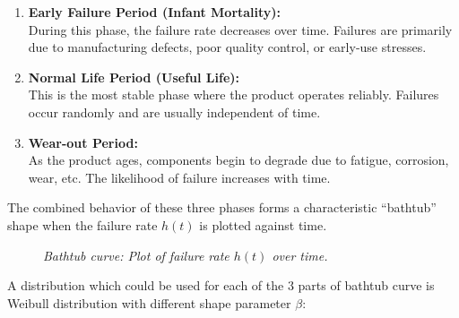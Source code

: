 \documentclass[twoside]{book}
\begin{document}
\begin{enumerate}
    \item \textbf{Early Failure Period (Infant Mortality):} \\
    During this phase, the failure rate decreases over time. Failures are primarily due to manufacturing defects, poor quality control, or early-use stresses. \\

    \item \textbf{Normal Life Period (Useful Life):} \\
    This is the most stable phase where the product operates reliably. Failures occur randomly and are usually independent of time. \\

    \item \textbf{Wear-out Period:} \\
    As the product ages, components begin to degrade due to fatigue, corrosion, wear, etc. The likelihood of failure increases with time.
\end{enumerate}

The combined behavior of these three phases forms a characteristic ``bathtub'' shape when the failure rate \( h(t) \) is plotted against time.

\begin{figure}[H]
\centering
{}
\caption{\textit{Bathtub curve: Plot of failure rate \( h(t) \) over time.}}
\end{figure}

A distribution which could be used for each of the 3 parts of bathtub curve is Weibull distribution with different shape
parameter $ \beta $:
\end{document}
